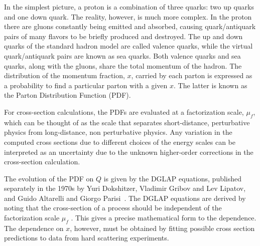 In the simplest picture, a proton is a combination of three quarks: two up quarks and one down quark. The reality, however, is much more complex. In the proton there are gluons constantly being emitted and absorbed, causing quark/antiquark pairs of many flavors to be briefly produced and destroyed. The up and down quarks of the standard hadron model are called valence quarks, while the virtual quark/antiquark pairs are known as sea quarks. Both valence quarks and sea quarks, along with the gluons, share the total momentum of the hadron.
 The distribution of the momentum fraction, $x$, carried by each parton is expressed as a probability to find a particular parton with a given $x$. The latter is known as the Parton Distribution Function (PDF).


For cross-section calculations, the PDFs are evaluated at a factorization scale, $\mu_f$, which can be thought of as the scale that separates short-distance, perturbative physics from long-distance, non perturbative physics.
Any variation in the computed cross sections due to different choices of the energy scales can be interpreted as an uncertainty due to the unknown higher-order corrections in the cross-section  calculation.


The evolution of the PDF on $Q$ is given by the DGLAP equations, published separately in the 1970s by Yuri Dokshitzer, Vladimir Gribov and Lev Lipatov, and Guido Altarelli and Giorgo Parisi~\cite{Altarelli1977298}. The DGLAP equations are derived by noting that the %
cross-section of a process should be independent of the factorization scale $\mu_f$ . This gives a precise mathematical form to the dependence.  The dependence on $x$, however, must be obtained by fitting possible cross section predictions to data from hard scattering experiments.

